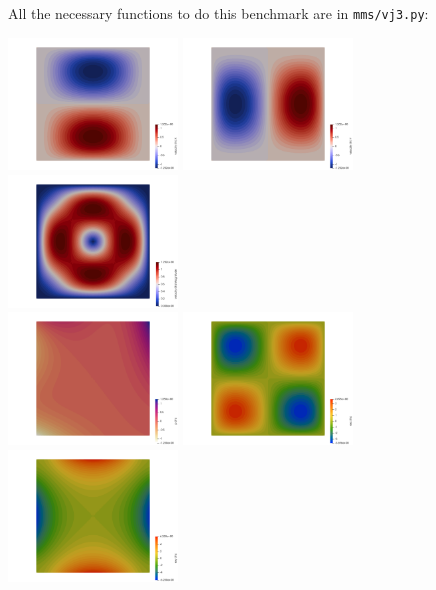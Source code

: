 All the necessary functions to do this benchmark are in {\tt mms/vj3.py}:


\begin{center}
\includegraphics[width=4.5cm]{images/mms/vj3/u}
\includegraphics[width=4.5cm]{images/mms/vj3/v}
\includegraphics[width=4.5cm]{images/mms/vj3/vel}\\
\includegraphics[width=4.5cm]{images/mms/vj3/p}
\includegraphics[width=4.5cm]{images/mms/vj3/exx}
\includegraphics[width=4.5cm]{images/mms/vj3/exy}
\end{center}

